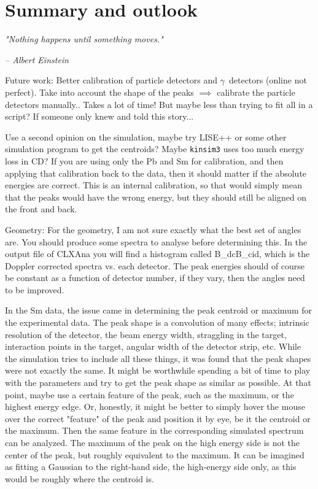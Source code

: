 \documentclass[twoside,english]{uiofysmaster/uiofysmaster}
\newcommand{\ga}{$\gamma$}
\begin{document}
\chapter{Summary and outlook}
\epigraph{\textit{"Nothing happens until something moves."}}{\textit{– Albert Einstein}}


Future work: Better calibration of particle detectors and \ga\ detectors (online not perfect). Take into account the shape of the peaks $\implies$ calibrate the particle detectors manually.. Takes a lot of time! But maybe less than trying to fit all in a script? If someone only knew and told this story...

Use a second opinion on the simulation, maybe try LISE++ or some other simulation program to get the centroids?
Maybe \texttt{kinsim3} uses too much energy loss in CD? 
If you are using only the Pb and Sm for calibration, and then applying that calibration back to the data, then it should matter if the absolute energies are correct. 
This is an internal calibration, so that would simply mean that the peaks would have the wrong energy, but they should still be aligned on the front and back.


\bigskip

Geometry:
For the geometry, I am not sure exactly what the best set of angles are. You should produce some spectra to analyse before determining this. In the output file of CLXAna you will find a histogram called B\_dcB\_cid, which is the Doppler corrected spectra vs. each detector. The peak energies should of course be constant as a function of detector number, if they vary, then the angles need to be improved.


\bigskip


In the Sm data, the issue came in determining the peak centroid or maximum for the experimental data. 
The peak shape is a convolution of many effects; intrinsic resolution of the detector, the beam energy width, straggling in the target, interaction points in the target, angular width of the detector strip, etc. 
While the simulation tries to include all these things, it was found that the peak shapes were not exactly the same. 
It might be worthwhile spending a bit of time to play with the parameters and try to get the peak shape as similar as possible. 
At that point, maybe use a certain feature of the peak, such as the maximum, or the highest energy edge. 
Or, honestly, it might be better to simply hover the mouse over the correct "feature" of the peak and position it by eye, be it the centroid or the maximum.
Then the same feature in the corresponding simulated spectrum can be analyzed.
The maximum of the peak on the high energy side is not the center of the peak, but roughly equivalent to the maximum. 
It can be imagined as fitting a Gaussian to the right-hand side, the high-energy side only, as this would be roughly where the centroid is. 
\end{document}
